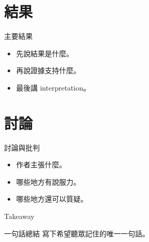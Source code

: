 \documentclass[aspectratio=169]{ctexbeamer}
\begin{document}
\section{結果}

\begin{frame}{主要結果}
\begin{itemize}
  \item 先說結果是什麼。
  \item 再說證據支持什麼。
  \item 最後講 interpretation。
\end{itemize}
\end{frame}

\section{討論}

\begin{frame}{討論與批判}
\begin{itemize}
  \item 作者主張什麼。
  \item 哪些地方有說服力。
  \item 哪些地方還可以質疑。
\end{itemize}
\end{frame}

\begin{frame}{Takeaway}
\begin{alertblock}{一句話總結}
寫下希望聽眾記住的唯一一句話。
\end{alertblock}
\end{frame}
\end{document}
